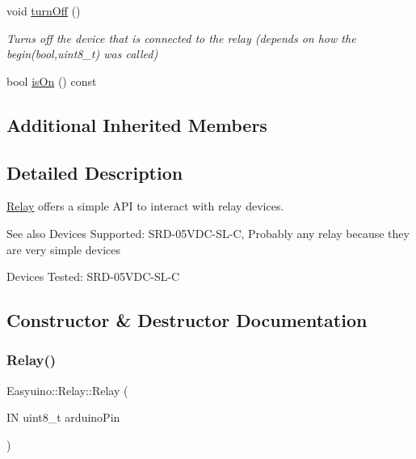 \begin{DoxyCompactItemize}
\mbox{\label{class_easyuino_1_1_relay_a9cab51ad0aaea32752df829f3f6b8113}} 
void \hyperlink{class_easyuino_1_1_relay_a9cab51ad0aaea32752df829f3f6b8113}{turn\+Off} ()
\begin{DoxyCompactList}\small\item\em Turns off the device that is connected to the relay (depends on how the begin(bool,uint8\+\_\+t) was called) \end{DoxyCompactList}\item 
bool \hyperlink{class_easyuino_1_1_relay_af8b4ac99e27ffac6c5f8d69d36dc01f5}{is\+On} () const
\end{DoxyCompactItemize}
\subsection*{Additional Inherited Members}


\subsection{Detailed Description}
\hyperlink{class_easyuino_1_1_relay}{Relay} offers a simple A\+PI to interact with relay devices. 

\begin{DoxySeeAlso}{See also}
Devices Supported\+: S\+R\+D-\/05\+V\+D\+C-\/\+S\+L-\/C, Probably any relay because they are very simple devices 

Devices Tested\+: S\+R\+D-\/05\+V\+D\+C-\/\+S\+L-\/C 
\end{DoxySeeAlso}


\subsection{Constructor \& Destructor Documentation}
\mbox{\label{class_easyuino_1_1_relay_a34a9e8461a4018e88ee49d956aca37f7}} 
\subsubsection{\texorpdfstring{Relay()}{Relay()}}
{\footnotesize\ttfamily Easyuino\+::\+Relay\+::\+Relay (\begin{DoxyParamCaption}\item[{IN uint8\+\_\+t}]{arduino\+Pin }\end{DoxyParamCaption})}



